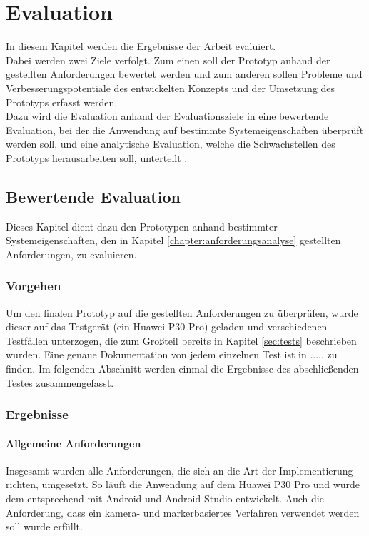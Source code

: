 \chapter{Evaluation}\label{chapter:evaluation}
In diesem Kapitel werden die Ergebnisse der Arbeit evaluiert. \\
Dabei werden zwei Ziele verfolgt. Zum einen soll der Prototyp anhand der gestellten Anforderungen bewertet werden und zum anderen sollen Probleme und Verbesserungspotentiale des entwickelten Konzepts und der Umsetzung des Prototyps erfasst werden. \\
Dazu wird die Evaluation anhand der Evaluationsziele in eine bewertende Evaluation, bei der die Anwendung auf bestimmte Systemeigenschaften überprüft werden soll, und eine analytische Evaluation, welche die Schwachstellen des Prototyps herausarbeiten soll, unterteilt \citep{hegner:evaluation}.


\section{Bewertende Evaluation}\label{sec:bewertende-evaluation}
Dieses Kapitel dient dazu den Prototypen anhand bestimmter Systemeigenschaften, den in Kapitel \ref{chapter:anforderungsanalyse} gestellten Anforderungen, zu evaluieren. 

\subsection{Vorgehen}
Um den finalen Prototyp auf die gestellten Anforderungen zu überprüfen, wurde dieser auf das Testgerät (ein Huawei P30 Pro) geladen und verschiedenen Testfällen unterzogen, die zum Großteil bereits in Kapitel \ref{sec:tests} beschrieben wurden. Eine genaue Dokumentation von jedem einzelnen Test ist in ..... zu finden. 
Im folgenden Abschnitt werden einmal die Ergebnisse des abschließenden Testes zusammengefasst.

\subsection{Ergebnisse}
\subsubsection{Allgemeine Anforderungen}
Insgesamt wurden alle Anforderungen, die sich an die Art der Implementierung richten, umgesetzt.
So läuft die Anwendung auf dem Huawei P30 Pro und wurde dem entsprechend mit Android und Android Studio entwickelt. Auch die Anforderung, dass ein kamera- und markerbasiertes Verfahren verwendet werden soll wurde erfüllt.
